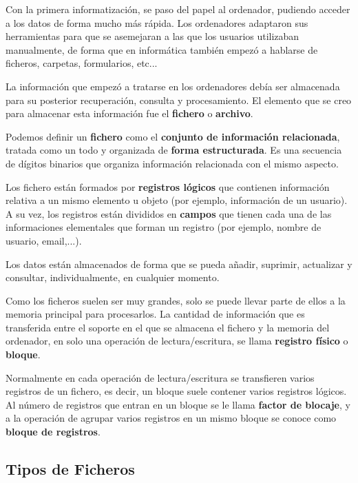 Con la primera informatización, se paso del papel al ordenador, pudiendo acceder a los datos de forma mucho más rápida. Los ordenadores adaptaron sus herramientas para que se asemejaran a las que los usuarios utilizaban manualmente, de forma que en informática también empezó a hablarse de ficheros, carpetas, formularios, etc...

La información que empezó a tratarse en los ordenadores debía ser almacenada para su posterior recuperación, consulta y procesamiento. El elemento que se creo para almacenar esta información fue el \textbf{fichero} o \textbf{archivo}.

Podemos definir un \textbf{fichero} como el \textbf{conjunto de información relacionada}, tratada como un todo y organizada de \textbf{forma estructurada}. Es una secuencia de  dígitos binarios que organiza información relacionada con el mismo aspecto.

Los fichero están formados por \textbf{registros lógicos} que contienen información relativa a un mismo elemento u objeto (por ejemplo, información de un usuario). A su vez, los registros están divididos en \textbf{campos} que tienen cada una de las informaciones elementales que forman un registro (por ejemplo, nombre de usuario, email,...).

Los datos están almacenados de forma que se pueda añadir, suprimir, actualizar y consultar, individualmente, en cualquier momento.

Como los ficheros suelen ser muy grandes, solo se puede llevar parte de ellos a la memoria principal para procesarlos. La cantidad de información que es transferida entre el soporte en el que se almacena el fichero y la memoria del ordenador, en solo una operación de lectura/escritura, se llama \textbf{registro físico} o  \textbf{bloque}.

Normalmente en cada operación de lectura/escritura se transfieren varios registros de un fichero, es decir, un bloque suele contener varios registros lógicos. Al número de registros que entran en un bloque se le llama \textbf{factor de blocaje}, y a la operación de agrupar varios registros en un mismo bloque se conoce como \textbf{bloque de registros}.

\subsection{Tipos de Ficheros}




\glsaddall
\printglossaries


\newpage
{}



